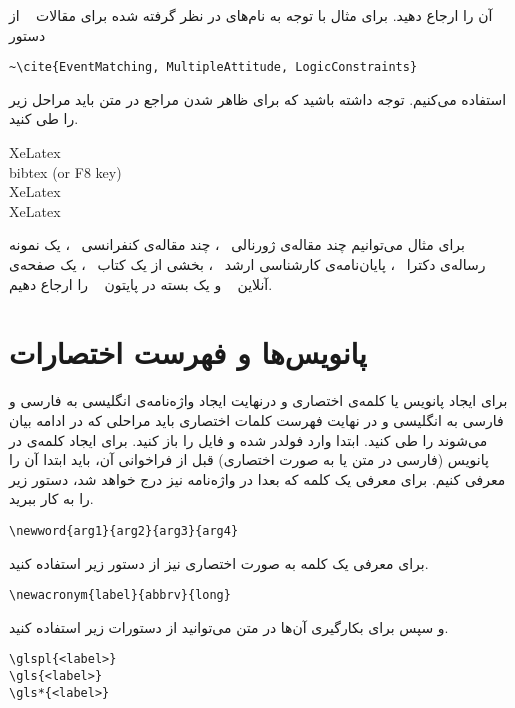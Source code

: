 آن را ارجاع دهید. برای مثال با توجه به نام‌های در نظر گرفته شده برای 
مقالات 
~\cite{MultipleAttitude, LogicConstraints, EventMatching} 
از دستور 
\begin{latin} 
	\noindent
	\verb|~\cite{EventMatching, MultipleAttitude, LogicConstraints}|
\end{latin} 
استفاده می‌کنیم. توجه داشته باشید که برای ظاهر شدن مراجع در متن  باید مراحل زیر را طی کنید. 
	\begin{latin}
		\noindent
		XeLatex \\
		bibtex (or F8 key)\\
		XeLatex\\
		XeLatex\\
	\end{latin}
برای مثال می‌توانیم چند مقاله‌ی ژورنالی 
~\cite{LMIController, watts1998collective, RobustMPC, Nematzadeh, RecommenderSystems}، 
چند مقاله‌ی کنفرانسی
~\cite{BiasedAntagonism, MultipleAttitude}، 
یک نمونه رساله‌ی دکترا 
~\cite{nematThesis}،
پایان‌نامه‌ی کارشناسی ارشد 
~\cite{hosseiniThesis}، 
بخشی از یک کتاب 
~\cite{bullo2018lectures}،
یک صفحه‌ی آنلاین 
~\cite{PewResearchCenter2017}
و یک بسته‌ در پایتون 
~\cite{NetworkX} 
را ارجاع دهیم.  

\section{پانویس‌ها و فهرست اختصارات}
برای ایجاد پانویس یا کلمه‌ی اختصاری و درنهایت ایجاد واژه‌نامه‌ی انگلیسی به فارسی و فارسی به انگلیسی و در نهایت فهرست کلمات اختصاری باید مراحلی که در ادامه بیان می‌شوند را طی کنید. ابتدا وارد فولدر 
شده و فایل 
را باز کنید. برای ایجاد کلمه‌ی در پانویس (فارسی در متن یا به صورت اختصاری) قبل از فراخوانی آن، باید ابتدا آن را معرفی کنیم. برای معرفی یک کلمه که بعدا در واژه‌نامه نیز درج خواهد شد، دستور زیر را به کار ببرید. 
	\begin{latin}
		\noindent
		\verb|\newword{arg1}{arg2}{arg3}{arg4}|
	\end{latin}

برای معرفی یک کلمه به صورت اختصاری نیز از دستور زیر استفاده کنید. 
\begin{latin}
	\noindent
	\verb|\newacronym{label}{abbrv}{long}| 
\end{latin}

و سپس برای بکارگیری آن‌ها در متن می‌توانید از دستورات زیر استفاده کنید. 

\begin{latin}
	\noindent
	\verb|\glspl{<label>}| \\ 
	\verb|\gls{<label>}| \\
	\verb|\gls*{<label>}| 
\end{latin}

